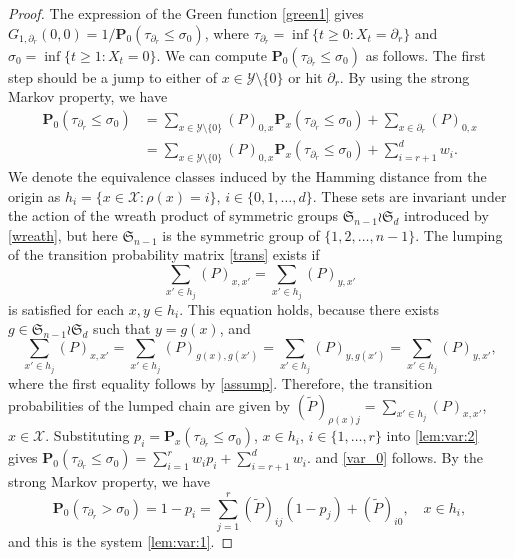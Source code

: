 \documentclass[a4paper,11pt]{article}
\theoremstyle{plain}
\theoremstyle{definition}
\begin{document}
\begin{proof}
  The expression of the Green function \eqref{green1}
  gives
  $G_{1,\partial_r}(0,0)=1/\mathbf{P}_0(\tau_{\partial_r}\le\sigma_0)$, where $\tau_{\partial_r}=\inf\{t\ge 0:X_t=\partial_r\}$
  and $\sigma_0=\inf\{t\ge 1:X_t=0\}$.
  We can compute $\mathbf{P}_0(\tau_{\partial_r}\le\sigma_0)$
  as follows. The first step should be a jump to
  either of $x\in\mathcal{Y}\setminus\{0\}$ or
  hit $\partial_r$. By using the strong Markov property,
  we have
  \begin{align}
    \mathbf{P}_0(\tau_{\partial_r}\le \sigma_0)
    &=\sum_{x\in\mathcal{Y}\setminus\{0\}} (P)_{0,x}
    \mathbf{P}_x(\tau_{\partial_r}\le \sigma_0)
    +\sum_{x\in\partial_r} (P)_{0,x}\nonumber\\
    &=\sum_{x\in\mathcal{Y}\setminus\{0\}} (P)_{0,x}
    \mathbf{P}_x(\tau_{\partial_r}\le \sigma_0)+\sum_{i=r+1}^d w_i.
    \label{lem:var:2}
  \end{align}
  We denote the equivalence classes induced by
  the Hamming distance from the origin as
  $h_i=\{x\in\mathcal{X}:\rho(x)=i\}$,
  $i\in\{0,1,\ldots,d\}$.
  These sets are invariant under the action of
  the wreath product of symmetric groups
  $\mathfrak{S}_{n-1}\wr\mathfrak{S}_d$
  introduced by \eqref{wreath}, but here
  $\mathfrak{S}_{n-1}$ is the symmetric group of
  $\{1,2,\ldots,n-1\}$.
  The lumping of the transition probability matrix
  \eqref{trans} exists if 
  \begin{equation*}%
    \sum_{x'\in h_j} (P)_{x,x'}=\sum_{x'\in h_j} (P)_{y,x'}
  \end{equation*}
  is satisfied for each $x,y\in h_i$. This equation
  holds, because there exists
  $g\in\mathfrak{S}_{n-1}\wr\mathfrak{S}_d$
  such that $y=g(x)$, and 
  \[
    \sum_{x'\in h_j} (P)_{x,x'}
    =\sum_{x'\in h_j} (P)_{g(x),g(x')}
    =\sum_{x'\in h_j} (P)_{y,g(x')}
    =\sum_{x'\in h_j} (P)_{y,x'},
  \]
  where the first equality follows by \eqref{assump}.
  Therefore, the transition probabilities of the lumped
  chain are given by
  $(\tilde{P})_{\rho(x)j}=\sum_{x'\in h_j} (P)_{x,x'}$,
  $x\in\mathcal{X}$. Substituting
  $p_i=\mathbf{P}_x(\tau_{\partial_r}\le\sigma_0)$,
  $x\in h_i$, $i\in\{1,\ldots,r\}$ into
  \eqref{lem:var:2} gives
  $\mathbf{P}_0(\tau_{\partial_r}\le\sigma_0)
    =\sum_{i=1}^r w_i p_i+\sum_{i=r+1}^d w_i$.
  and \eqref{var_0} follows. By the strong Markov property,
  we have
  \begin{equation*}
    \mathbf{P}_0(\tau_{\partial_r}>\sigma_0)=1-p_i=
    \sum_{j=1}^r (\tilde{P})_{ij}(1-p_j)+(\tilde{P})_{i0},\quad x\in h_i,
  \end{equation*}
  and this is the system \eqref{lem:var:1}.
\end{proof}
\end{document}
